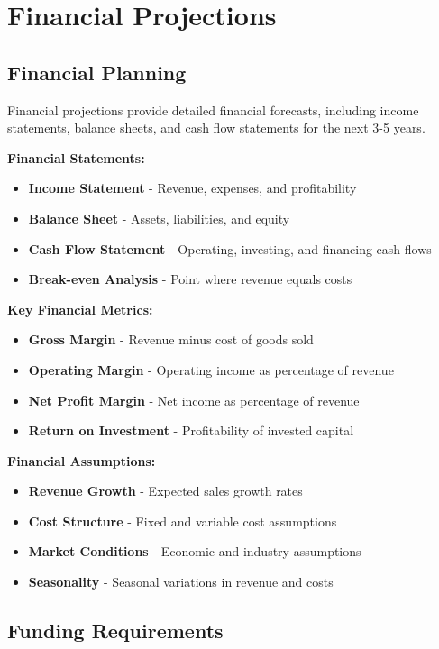 \documentclass[12pt]{article}
\begin{document}
\section{Financial Projections}

\subsection{Financial Planning}
Financial projections provide detailed financial forecasts, including income statements, balance sheets, and cash flow statements for the next 3-5 years.

\textbf{Financial Statements:}
\begin{itemize}
    \item \textbf{Income Statement} - Revenue, expenses, and profitability
    \item \textbf{Balance Sheet} - Assets, liabilities, and equity
    \item \textbf{Cash Flow Statement} - Operating, investing, and financing cash flows
    \item \textbf{Break-even Analysis} - Point where revenue equals costs
\end{itemize}

\textbf{Key Financial Metrics:}
\begin{itemize}
    \item \textbf{Gross Margin} - Revenue minus cost of goods sold
    \item \textbf{Operating Margin} - Operating income as percentage of revenue
    \item \textbf{Net Profit Margin} - Net income as percentage of revenue
    \item \textbf{Return on Investment} - Profitability of invested capital
\end{itemize}

\textbf{Financial Assumptions:}
\begin{itemize}
    \item \textbf{Revenue Growth} - Expected sales growth rates
    \item \textbf{Cost Structure} - Fixed and variable cost assumptions
    \item \textbf{Market Conditions} - Economic and industry assumptions
    \item \textbf{Seasonality} - Seasonal variations in revenue and costs
\end{itemize}

\subsection{Funding Requirements}
\end{document}
